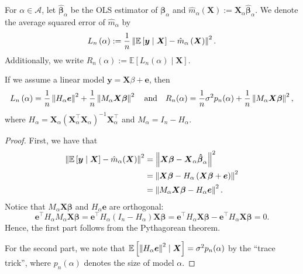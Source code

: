 \documentclass[12pt, letter paper]{article}
\newcommand{\1}{\mathmybb{1}}
\newcommand{\0}{\emptyset}
\newcommand{\Ep}[1]{\mathbb{E}\left[ #1 \right]}
\newcommand{\paren}[1]{\left(#1 \right)}
\newcommand{\norm}[1]{\left|\hspace{-1pt}\left|#1 \right|\hspace{-1pt}\right|}
\newcommand{\normsq}[1]{\norm{#1}^{2}}
\newcommand{\Acal}{\mathcal{A}}
\newcommand{\X}{\boldsymbol{X}}
\newcommand{\y}{\boldsymbol{y}}
\newcommand{\e}{\boldsymbol{e}}
\newcommand{\bbeta}{\boldsymbol{\beta}}
\newcommand{\bbetahat}{\boldsymbol{\hat{\beta}}}
\newcommand{\Loss}[1]{L_{n}\paren{#1}}
\begin{document}
\begin{definition}
    For \(\alpha\in\Acal\), let \(\bbetahat_{\alpha}\) be the OLS estimator of \(\bbeta_{\alpha}\) and \(\hat{m}_{\alpha}(\X):=\X_{\alpha}\bbetahat_{\alpha}\). We denote the average squared error of \(\hat{m}_{\alpha}\) by
    \[\Loss{\alpha}:=\frac{1}{n}\normsq{\Ep{\y\mid\X} - \hat{m}_{\alpha}\paren{\X}}.\]
    Additionally, we write
    \(R_{n}(\alpha):= \Ep{\Loss{\alpha}\mid\X}\).
\end{definition}

\begin{proposition}{}
    If we assume a linear model \(\y = \X\beta + \e\), then
    \[\Loss{\alpha} = \frac{1}{n}\normsq{H_{\alpha}\e} + \frac{1}{n}\normsq{M_{\alpha}\X\bbeta}\quad\text{and}\quad R_{n}(\alpha) = \frac{1}{n}\sigma^{2}p_{n}(\alpha) + \frac{1}{n}\normsq{M_{\alpha}\X\bbeta},\]
    where \(H_{\alpha} = \X_{\alpha}\paren{\X_{\alpha}^{\top}\X_{\alpha}}^{-1}\X_{\alpha}^{\top}\) and \(M_{\alpha}= I_{n} - H_{\alpha}\).
\end{proposition}
\begin{proof}
    First, we have that
    \begin{align*}
        \normsq{\Ep{\y\mid\X} - \hat{m}_{\alpha}(\X)} &= \normsq{\X\bbeta - \X_{\alpha}\bbetahat_{\alpha}}\\
        &= \normsq{\X\bbeta - H_{\alpha}\paren{\X\bbeta + \e}}\\
        &= \normsq{M_{\alpha}\X\bbeta - H_{\alpha}\e}.
    \end{align*}
    Notice that \(M_{\alpha}\X\bbeta\) and \(H_{\alpha}\e\) are orthogonal:
    \[\e^{\top}H_{\alpha}M_{\alpha}\X\bbeta  = \e^{\top}H_{\alpha}\paren{I_{n} - H_{\alpha}}\X\bbeta = \e^{\top}H_{\alpha}\X\bbeta - \e^{\top}H_{\alpha}\X\bbeta = 0.\]
    Hence, the first part follows from the Pythagorean theorem.

    For the second part, we note that \(\Ep{\normsq{H_{\alpha}\e}\mid\X} = \sigma^{2}p_{n}(\alpha)\) by the ``trace trick'', where \(p_{n}(\alpha)\) denotes the size of model \(\alpha\).
\end{proof}
\end{document}
